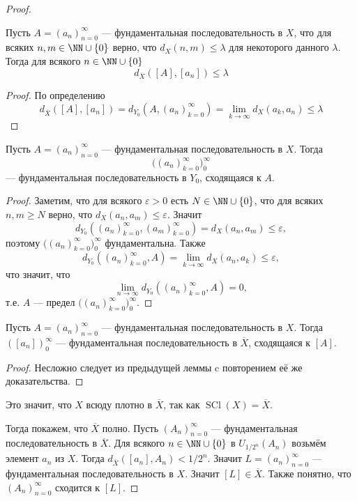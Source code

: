 \documentclass[12pt,a4paper]{article}
\DeclareMathOperator{\SCl}{SCl}
\begin{document}
\begin{proof}
        \begin{thlemma}
            Пусть $A = (a_n)_{n=0}^\infty$ --- фундаментальная последовательность в $X$, что для всяких $n, m \in \NN \cup \{0\}$ верно, что $d_X(n, m) \leqslant \lambda$ для некоторого данного $\lambda$. Тогда для всякого $n \in \NN \cup \{0\}$
            \[d_{\overline{X}}([A], [a_n]) \leqslant \lambda\]
        \end{thlemma}

        \begin{proof}
            По определению
            \[d_{\overline{X}}([A], [a_n]) = d_{Y_0}(A, (a_n)_{k=0}^\infty) = \lim_{k \to \infty} d_X(a_k, a_n) \leqslant \lambda\]
        \end{proof}

        \begin{thlemma}
            Пусть $A = (a_n)_{n=0}^\infty$ --- фундаментальная последовательность в $X$. Тогда
            \[\bigl((a_n)_{k=0}^\infty\bigr)_{0}^\infty\]
            --- фундаментальная последовательность в $Y_0$, сходящаяся к $A$.
        \end{thlemma}

        \begin{proof}
            Заметим, что для всякого $\varepsilon > 0$ есть $N \in \NN \cup \{0\}$, что для всяких $n, m \geqslant N$ верно, что $d_X(a_n, a_m) \leqslant \varepsilon$. Значит
            \[d_{Y_0}((a_n)_{k=0}^\infty, (a_m)_{k=0}^\infty) = d_X(a_n, a_m) \leqslant \varepsilon,\]
            поэтому $\bigl((a_n)_{k=0}^\infty\bigr)_{0}^\infty$ фундаментальна. Также
            \[d_{Y_0}((a_n)_{k=0}^\infty, A) = \lim_{k \to \infty} d_X(a_n, a_k) \leqslant \varepsilon,\]
            что значит, что
            \[\lim_{n \to \infty} d_{Y_0}((a_n)_{k=0}^\infty, A) = 0,\]
            т.е. $A$ --- предел $\bigl((a_n)_{k=0}^\infty\bigr)_{0}^\infty$.
        \end{proof}

        \begin{thlemma}
            Пусть $A = (a_n)_{n=0}^\infty$ --- фундаментальная последовательность в $X$. Тогда $([a_n])_{0}^\infty$ --- фундаментальная последовательность в $\overline{X}$, сходящаяся к $[A]$.
        \end{thlemma}

        \begin{proof}
            Несложно следует из предыдущей леммы c повторением её же доказательства.
        \end{proof}

        Это значит, что $X$ всюду плотно в $\overline{X}$, так как $\SCl(X) = \overline{X}$.

        Тогда покажем, что $\overline{X}$ полно. Пусть $(A_n)_{n=0}^\infty$ --- фундаментальная последовательность в $\overline{X}$. Для всякого $n \in \NN \cup \{0\}$ в $U_{1/2^n}(A_n)$ возьмём элемент $a_n$ из $X$. Тогда $d_{\overline{X}}([a_n], A_n) < 1/2^n$. Значит $L = (a_n)_{n=0}^\infty$ --- фундаментальная последовательность в $X$. Значит $[L] \in \overline{X}$. Также понятно, что $(A_n)_{n=0}^\infty$ сходится к $[L]$.
    \end{proof}
\end{document}
